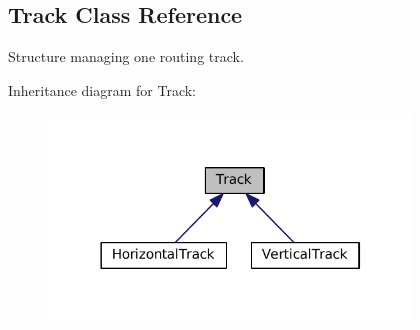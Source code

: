 \hypertarget{classKite_1_1Track}{}\subsection{Track Class Reference}
\label{classKite_1_1Track}


Structure managing one routing track.  




Inheritance diagram for Track\+:\nopagebreak
\begin{figure}[H]
\begin{center}
\leavevmode
\includegraphics[width=273pt]{classKite_1_1Track__inherit__graph}
\end{center}
\end{figure}
